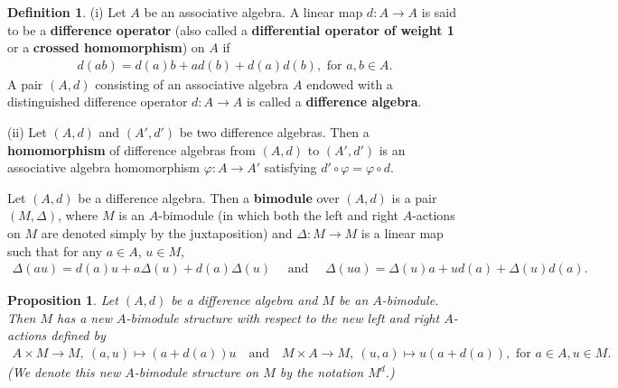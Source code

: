 \documentclass[a4paper,reqno,10pt]{amsart}
\theoremstyle{plain}
\newtheorem{prop}[thm]{Proposition}
\theoremstyle{definition}
\newtheorem{defn}[thm]{Definition}
\theoremstyle{remark}
\begin{document}
\begin{defn}
    (i) Let $A$ be an associative algebra. A linear map $d : A \rightarrow A$ is said to be a {\bf difference operator} (also called a {\bf differential operator of weight 1} or a {\bf crossed homomorphism}) on $A$ if
    \begin{align*}
        d (a b) = d(a) b + a d(b) + d(a) d(b), \text{ for } a, b \in A.
    \end{align*}
    A pair $(A, d)$ consisting of an associative algebra $A$ endowed with a distinguished difference operator $d: A \rightarrow A$ is called a {\bf difference algebra}.

    \medskip

    (ii) Let $(A, d)$ and $(A', d')$  be two difference algebras. Then a {\bf homomorphism} of difference algebras from $(A, d)$ to $(A', d')$ is an associative algebra homomorphism $\varphi : A \rightarrow A'$ satisfying $d' \circ \varphi = \varphi \circ d$.
\end{defn}

Let $(A, d)$ be a difference algebra. Then a {\bf bimodule} over $(A, d)$ is a pair $(M, \Delta)$, where $M$ is an $A$-bimodule (in which both the left and right $A$-actions on $M$ are denoted simply by the juxtaposition) and $\Delta : M \rightarrow M$ is a linear map such that for any $a \in A$, $u \in M$,
\begin{align*}
    \Delta (au) = d(a) u + a \Delta (u) + d(a) \Delta (u) \quad \text{ and } \quad \Delta (ua) = \Delta (u) a + u d(a) + \Delta (u) d(a).
\end{align*}

\begin{prop}
    Let $(A, d)$ be a difference algebra and $M$ be an $A$-bimodule. Then $M$ has a new $A$-bimodule structure with respect to the new left and right $A$-actions defined by
    \begin{align*}
        A \times M \rightarrow M, ~(a, u) \mapsto (a + d(a)) u ~~~ \text{ and } ~~~ M \times A \rightarrow M, ~ (u, a) \mapsto u (a + d(a)), \text{ for } a \in A, u \in M.
    \end{align*}
(We denote this new $A$-bimodule structure on $M$ by the notation $M^d$.)
\end{prop}
\end{document}
